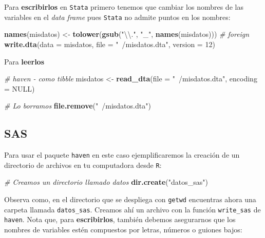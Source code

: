 \documentclass[]{article}
\newenvironment{Shaded}{\begin{snugshade}}{\end{snugshade}}
\newcommand{\KeywordTok}[1]{\textcolor[rgb]{0.13,0.29,0.53}{\textbf{#1}}}
\newcommand{\DataTypeTok}[1]{\textcolor[rgb]{0.13,0.29,0.53}{#1}}
\newcommand{\DecValTok}[1]{\textcolor[rgb]{0.00,0.00,0.81}{#1}}
\newcommand{\CharTok}[1]{\textcolor[rgb]{0.31,0.60,0.02}{#1}}
\newcommand{\StringTok}[1]{\textcolor[rgb]{0.31,0.60,0.02}{#1}}
\newcommand{\CommentTok}[1]{\textcolor[rgb]{0.56,0.35,0.01}{\textit{#1}}}
\newcommand{\OtherTok}[1]{\textcolor[rgb]{0.56,0.35,0.01}{#1}}
\newcommand{\NormalTok}[1]{#1}
\begin{document}
Para \textbf{escribirlos} en \texttt{Stata} primero tenemos que cambiar
los nombres de las variables en el \emph{data frame} pues \texttt{Stata}
no admite puntos en los nombres:

\begin{Shaded}
\begin{Highlighting}[]
\KeywordTok{names}\NormalTok{(misdatos) <-}\StringTok{ }\KeywordTok{tolower}\NormalTok{(}\KeywordTok{gsub}\NormalTok{(}\StringTok{"}\CharTok{\textbackslash{}\textbackslash{}}\StringTok{."}\NormalTok{, }\StringTok{"_"}\NormalTok{, }\KeywordTok{names}\NormalTok{(misdatos)))}
\CommentTok{# foreign}
\KeywordTok{write.dta}\NormalTok{(}\DataTypeTok{data =}\NormalTok{ misdatos, }\DataTypeTok{file =} \StringTok{"~/misdatos.dta"}\NormalTok{, }\DataTypeTok{version =} \DecValTok{12}\NormalTok{)}
\end{Highlighting}
\end{Shaded}

Para \textbf{leerlos}

\begin{Shaded}
\begin{Highlighting}[]
\CommentTok{# haven - como tibble}
\NormalTok{misdatos <-}\StringTok{ }\KeywordTok{read_dta}\NormalTok{(}\DataTypeTok{file =} \StringTok{"~/misdatos.dta"}\NormalTok{, }\DataTypeTok{encoding =} \OtherTok{NULL}\NormalTok{)}

\CommentTok{# Lo borramos}
\KeywordTok{file.remove}\NormalTok{(}\StringTok{"~/misdatos.dta"}\NormalTok{)}
\end{Highlighting}
\end{Shaded}

\subsection{SAS}\label{sas}

Para usar el paquete \texttt{haven} en este caso ejemplificaremos la
creación de un directorio de archivos en tu computadora desde
\texttt{R}:

\begin{Shaded}
\begin{Highlighting}[]
\CommentTok{# Creamos un directorio llamado datos}
\KeywordTok{dir.create}\NormalTok{(}\StringTok{"datos_sas"}\NormalTok{)}
\end{Highlighting}
\end{Shaded}

Observa como, en el directorio que se despliega con \texttt{getwd}
encuentras ahora una carpeta llamada \texttt{datos\_sas}. Creamos ahí un
archivo con la función \texttt{write\_sas} de \texttt{haven}. Nota que,
para \textbf{escribirlos}, también debemos asegurarnos que los nombres
de variables estén compuestos por letras, números o guiones bajos:
\end{document}
